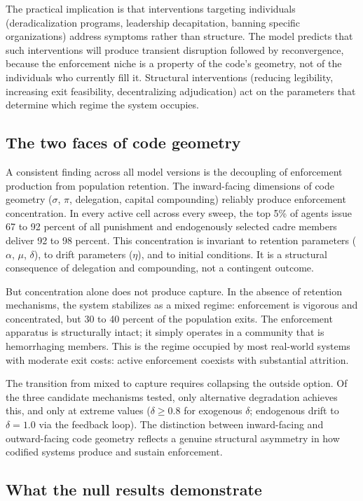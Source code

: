 \documentclass[12pt]{article}
\begin{document}
The practical implication is that interventions targeting individuals (deradicalization programs, leadership decapitation, banning specific organizations) address symptoms rather than structure. The model predicts that such interventions will produce transient disruption followed by reconvergence, because the enforcement niche is a property of the code's geometry, not of the individuals who currently fill it. Structural interventions (reducing legibility, increasing exit feasibility, decentralizing adjudication) act on the parameters that determine which regime the system occupies.

\subsection{The two faces of code geometry}

A consistent finding across all model versions is the decoupling of enforcement production from population retention. The inward-facing dimensions of code geometry ($\sigma$, $\pi$, delegation, capital compounding) reliably produce enforcement concentration. In every active cell across every sweep, the top 5\% of agents issue 67 to 92 percent of all punishment and endogenously selected cadre members deliver 92 to 98 percent. This concentration is invariant to retention parameters ($\alpha$, $\mu$, $\delta$), to drift parameters ($\eta$), and to initial conditions. It is a structural consequence of delegation and compounding, not a contingent outcome.

But concentration alone does not produce capture. In the absence of retention mechanisms, the system stabilizes as a mixed regime: enforcement is vigorous and concentrated, but 30 to 40 percent of the population exits. The enforcement apparatus is structurally intact; it simply operates in a community that is hemorrhaging members. This is the regime occupied by most real-world systems with moderate exit costs: active enforcement coexists with substantial attrition.

The transition from mixed to capture requires collapsing the outside option. Of the three candidate mechanisms tested, only alternative degradation achieves this, and only at extreme values ($\delta \geq 0.8$ for exogenous $\delta$; endogenous drift to $\delta = 1.0$ via the feedback loop). The distinction between inward-facing and outward-facing code geometry reflects a genuine structural asymmetry in how codified systems produce and sustain enforcement.

\subsection{What the null results demonstrate}
\end{document}
